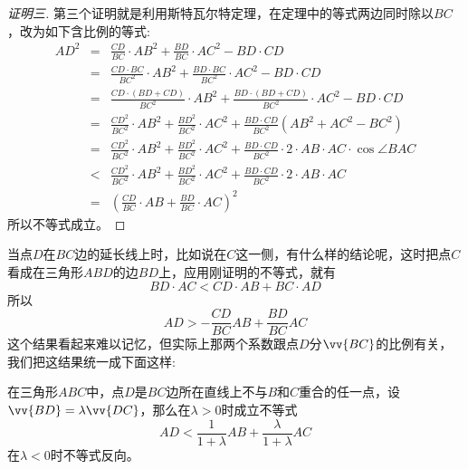 \begin{example}
  \begin{proof}[证明三]
  第三个证明就是利用斯特瓦尔特定理，在定理中的等式两边同时除以$BC$，改为如下含比例的等式:
  \begin{eqnarray*}
    AD^2 & = & \frac{CD}{BC} \cdot AB^2 + \frac{BD}{BC} \cdot AC^2 - BD \cdot CD \\
    & = & \frac{CD \cdot BC}{BC^2} \cdot AB^2 + \frac{BD \cdot BC}{BC^2} \cdot AC^2 - BD \cdot CD \\
    & = & \frac{CD \cdot (BD+CD)}{BC^2} \cdot AB^2 + \frac{BD \cdot (BD+CD)}{BC^2} \cdot AC^2 - BD \cdot CD \\
    & = & \frac{CD^2}{BC^2} \cdot AB^2 + \frac{BD^2}{BC^2} \cdot AC^2 + \frac{BD \cdot CD}{BC^2}(AB^2+AC^2-BC^2) \\
    & = & \frac{CD^2}{BC^2} \cdot AB^2 + \frac{BD^2}{BC^2} \cdot AC^2 + \frac{BD \cdot CD}{BC^2} \cdot 2 \cdot AB \cdot AC \cdot \cos{\angle BAC} \\
    & < & \frac{CD^2}{BC^2} \cdot AB^2 + \frac{BD^2}{BC^2} \cdot AC^2 + \frac{BD \cdot CD}{BC^2} \cdot 2 \cdot AB \cdot AC \\
    & = & \left( \frac{CD}{BC}\cdot AB + \frac{BD}{BC} \cdot AC \right)^2
  \end{eqnarray*}
  所以不等式成立。
  \end{proof}

  当点$D$在$BC$边的延长线上时，比如说在$C$这一侧，有什么样的结论呢，这时把点$C$看成在三角形$ABD$的边$BD$上，应用刚证明的不等式，就有
  \begin{equation*}
    BD \cdot AC < CD \cdot AB + BC \cdot AD
  \end{equation*}
  所以
  \begin{equation*}
    AD > -\frac{CD}{BC} AB + \frac{BD}{BC} AC
  \end{equation*}
  这个结果看起来难以记忆，但实际上那两个系数跟点$D$分$\vv{BC}$的比例有关，我们把这结果统一成下面这样:

  \begin{statement}
    在三角形$ABC$中，点$D$是$BC$边所在直线上不与$B$和$C$重合的任一点，设$\vv{BD}=\lambda\vv{DC}$，那么在$\lambda>0$时成立不等式
    \begin{equation}
      \label{eq:definite-proportion-inequality2}
      AD < \frac{1}{1+\lambda} AB + \frac{\lambda}{1+\lambda} AC
    \end{equation}
    在$\lambda<0$时不等式反向。
  \end{statement}
\end{example}


